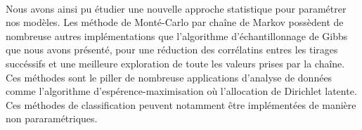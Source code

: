 \documentclass{article}
\theoremstyle{definition}
\theoremstyle{remark}
\begin{document}
{\paragraph{}
Nous avons ainsi pu étudier une nouvelle approche statistique pour paramétrer nos modèles. Les méthode de Monté-Carlo par chaîne 
de Markov possèdent de nombreuse autres implémentations que l'algorithme d'échantillonnage de Gibbs que nous avons présenté,
pour une réduction des corrélatins entres les tirages succéssifs et une meilleure exploration de toute les valeurs prises par la chaîne.
Ces méthodes sont le piller de nombreuse applications d'analyse de données comme l'algorithme d'espérence-maximisation 
où l'allocation de Dirichlet latente. Ces méthodes de classification peuvent notamment être implémentées de manière non pararamétriques.




























}
\end{document}
